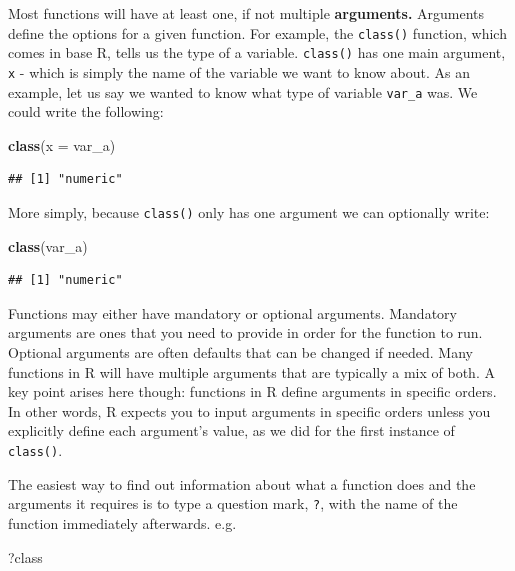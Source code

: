 \documentclass[
]{book}
\newenvironment{Shaded}{\begin{snugshade}}{\end{snugshade}}
\newcommand{\AttributeTok}[1]{\textcolor[rgb]{0.13,0.29,0.53}{#1}}
\newcommand{\FunctionTok}[1]{\textcolor[rgb]{0.13,0.29,0.53}{\textbf{#1}}}
\newcommand{\NormalTok}[1]{#1}
\begin{document}
Most functions will have at least one, if not multiple \textbf{arguments.} Arguments define the options for a given function. For example, the \texttt{class()} function, which comes in base R, tells us the type of a variable. \texttt{class()} has one main argument, \texttt{x} - which is simply the name of the variable we want to know about. As an example, let us say we wanted to know what type of variable \texttt{var\_a} was. We could write the following:

\begin{Shaded}
\begin{Highlighting}[]
\FunctionTok{class}\NormalTok{(}\AttributeTok{x =}\NormalTok{ var\_a)}
\end{Highlighting}
\end{Shaded}

\begin{verbatim}
## [1] "numeric"
\end{verbatim}

More simply, because \texttt{class()} only has one argument we can optionally write:

\begin{Shaded}
\begin{Highlighting}[]
\FunctionTok{class}\NormalTok{(var\_a)}
\end{Highlighting}
\end{Shaded}

\begin{verbatim}
## [1] "numeric"
\end{verbatim}

Functions may either have mandatory or optional arguments. Mandatory arguments are ones that you need to provide in order for the function to run. Optional arguments are often defaults that can be changed if needed. Many functions in R will have multiple arguments that are typically a mix of both. A key point arises here though: functions in R define arguments in specific orders. In other words, R expects you to input arguments in specific orders unless you explicitly define each argument's value, as we did for the first instance of \texttt{class()}.

The easiest way to find out information about what a function does and the arguments it requires is to type a question mark, \texttt{?}, with the name of the function immediately afterwards. e.g.~

\begin{Shaded}
\begin{Highlighting}[]
\NormalTok{?class}
\end{Highlighting}
\end{Shaded}
\end{document}
